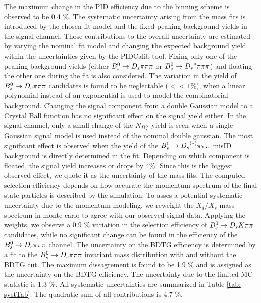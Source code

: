The maximum change in the PID efficiency due to the binning scheme is observed to be 0.4 $\%$. \newline
The systematic uncertainty arising from the mass fits is introduced by the chosen fit model and the fixed peaking background yields in the signal channel. 
Those contributions to the overall uncertainty are estimated by varying the nominal fit model and changing the expected background yield within the uncertainties given by the PIDCalib tool. 
Fixing only one of the peaking background yields (either ${{B}^0_{s}}\rightarrow{\ensuremath{{D}_{s}}}{\ensuremath{\pi}}{\ensuremath{\pi}}{\ensuremath{\pi}}$ or ${{B}^0_{s}}\rightarrow{\ensuremath{{D}_{s}}}^{*}{\pi}{\pi}{\pi}$) and floating the other one during the fit is also considered.
The variation in the yield of ${{B}^0_{s}}\rightarrow{\ensuremath{{D}_{s}}}{\ensuremath{\pi}}{\ensuremath{\pi}}{\ensuremath{\pi}}$ candidates is found to be neglectable ($<< 1 \%$), when a linear polynomial instead of an exponential is used to model the combinatorial background. 
Changing the signal component from a double Gaussian model to a Crystal Ball function has no significant effect on the signal yield either. 
In the signal channel, only a small change of the $N_{{{B}^0_{s}}}$ yield is seen when a single Gaussian signal model is used instead of the nominal double gaussian. 
The most significant effect is observed when the yield of the ${{B}^0_{s}}\rightarrow{\ensuremath{{D}_{s}}}^{(*)}{\pi}{\pi}{\pi}$ misID background is directly determined in the fit. 
Depending on which component is floated, the signal yield increases or drops by $4 \%$. Since this is the biggest observed effect, we quote it as the uncertainty of the mass fits. \newline
The computed selection efficiency depends on how accurate the momentum spectrum of the final state particles is described by the simulation. 
To asses a potential systematic uncertainty due to the momentum modeling, we reweight the $X_{d}/X_{s}$ mass spectrum in monte carlo to agree with our observed signal data. 
Applying the weights, we observe a 0.9 $\%$ variation in the selection efficiency of ${{B}^0_{s}}\rightarrow{\ensuremath{{D}_{s}}}{\ensuremath{K}}{\ensuremath{\pi}}{\ensuremath{\pi}}$ candidates, while no significant change can be found in the efficiency of the 
${{B}^0_{s}}\rightarrow{\ensuremath{{D}_{s}}}{\ensuremath{\pi}}{\ensuremath{\pi}}{\ensuremath{\pi}}$ channel. \newline   
The uncertainty on the BDTG efficiency is determined by a fit to the ${{B}^0_{s}}\rightarrow{\ensuremath{{D}_{s}}}{\ensuremath{\pi}}{\ensuremath{\pi}}{\ensuremath{\pi}}$ invariant mass distribution with and without the BDTG cut. 
The maximum dissagrement is found to be 1.9 $\%$ and is assigned as the uncertainty on the BDTG efficiency. \newline
The uncertainty due to the limited MC statistic is 1.3 $\%$. \newline
All systematic uncertainties are summarized in Table \ref{tab: systTab}. The quadratic sum of all contributions is 4.7 $\%$.  

